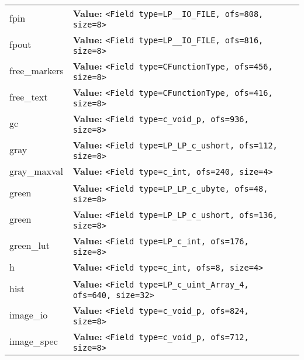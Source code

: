 \begin{longtable}{|p{\varnamewidth}|p{\vardescrwidth}|l}
\cline{1-2}
\raggedright f\-p\-i\-n\- & \raggedright \textbf{Value:} 
{\tt {\textless}Field type=LP\_\_IO\_FILE, ofs=808, size=8{\textgreater}}&\\
\cline{1-2}
\raggedright f\-p\-o\-u\-t\- & \raggedright \textbf{Value:} 
{\tt {\textless}Field type=LP\_\_IO\_FILE, ofs=816, size=8{\textgreater}}&\\
\cline{1-2}
\raggedright f\-r\-e\-e\-\_\-m\-a\-r\-k\-e\-r\-s\- & \raggedright \textbf{Value:} 
{\tt {\textless}Field type=CFunctionType, ofs=456, size=8{\textgreater}}&\\
\cline{1-2}
\raggedright f\-r\-e\-e\-\_\-t\-e\-x\-t\- & \raggedright \textbf{Value:} 
{\tt {\textless}Field type=CFunctionType, ofs=416, size=8{\textgreater}}&\\
\cline{1-2}
\raggedright g\-c\- & \raggedright \textbf{Value:} 
{\tt {\textless}Field type=c\_void\_p, ofs=936, size=8{\textgreater}}&\\
\cline{1-2}
\raggedright g\-r\-a\-y\- & \raggedright \textbf{Value:} 
{\tt {\textless}Field type=LP\_LP\_c\_ushort, ofs=112, size=8{\textgreater}}&\\
\cline{1-2}
\raggedright g\-r\-a\-y\-\_\-m\-a\-x\-v\-a\-l\- & \raggedright \textbf{Value:} 
{\tt {\textless}Field type=c\_int, ofs=240, size=4{\textgreater}}&\\
\cline{1-2}
\raggedright g\-r\-e\-e\-n\- & \raggedright \textbf{Value:} 
{\tt {\textless}Field type=LP\_LP\_c\_ubyte, ofs=48, size=8{\textgreater}}&\\
\cline{1-2}
\raggedright g\-r\-e\-e\-n\-1\-6\- & \raggedright \textbf{Value:} 
{\tt {\textless}Field type=LP\_LP\_c\_ushort, ofs=136, size=8{\textgreater}}&\\
\cline{1-2}
\raggedright g\-r\-e\-e\-n\-\_\-l\-u\-t\- & \raggedright \textbf{Value:} 
{\tt {\textless}Field type=LP\_c\_int, ofs=176, size=8{\textgreater}}&\\
\cline{1-2}
\raggedright h\- & \raggedright \textbf{Value:} 
{\tt {\textless}Field type=c\_int, ofs=8, size=4{\textgreater}}&\\
\cline{1-2}
\raggedright h\-i\-s\-t\- & \raggedright \textbf{Value:} 
{\tt {\textless}Field type=LP\_c\_uint\_Array\_4, ofs=640, size=32{\textgreater}}&\\
\cline{1-2}
\raggedright i\-m\-a\-g\-e\-\_\-i\-o\- & \raggedright \textbf{Value:} 
{\tt {\textless}Field type=c\_void\_p, ofs=824, size=8{\textgreater}}&\\
\cline{1-2}
\raggedright i\-m\-a\-g\-e\-\_\-s\-p\-e\-c\- & \raggedright \textbf{Value:} 
{\tt {\textless}Field type=c\_void\_p, ofs=712, size=8{\textgreater}}&\\

\end{longtable}
